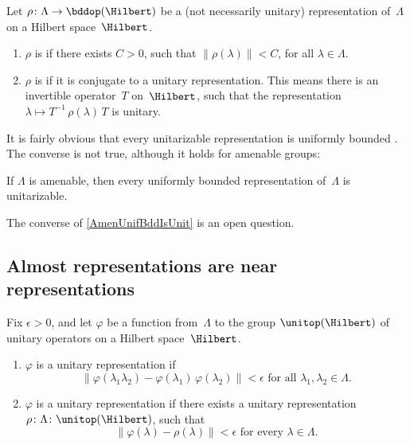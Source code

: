 \begin{defn}
Let $\rho \colon \Lambda \to \bddop(\Hilbert)$ be a (not necessarily unitary) representation of~$\Lambda$ on a Hilbert space~$\Hilbert$.
	\begin{enumerate}
	\item $\rho$ is  if there exists $C > 0$, such that $\| \rho(\lambda) \| < C$, for all $\lambda \in \Lambda$.
	\item $\rho$ is  if it is conjugate to a unitary representation. This means there is an invertible operator~$T$ on~$\Hilbert$, such that the representation $\lambda \mapsto T^{-1} \, \rho(\lambda) \, T$ is unitary.
	\end{enumerate}
\end{defn}

It is fairly obvious that every unitarizable representation is uniformly bounded . The converse is not true, although it holds for amenable groups:

\begin{thm} \label{AmenUnifBddIsUnit}
If $\Lambda$ is amenable, then every uniformly bounded representation of~$\Lambda$ is unitarizable.
\end{thm}

\begin{rem}
The converse of \cref{AmenUnifBddIsUnit} is an open question.
\end{rem}




\subsection{Almost representations are near representations}

\begin{defn}
Fix $\epsilon > 0$, and let $\varphi$ be a function from~$\Lambda$ to the group $\unitop(\Hilbert)$ of unitary operators on a Hilbert space~$\Hilbert$.
	\begin{enumerate}
	\item $\varphi$ is  a unitary representation if 
		$$ \text{$\| \varphi(\lambda_1 \lambda_2) -  \varphi(\lambda_1) \, \varphi( \lambda_2) \| < \epsilon$ for all $\lambda_1,\lambda_2 \in \Lambda$.} $$
	\item $\varphi$ is  a unitary representation if there exists a unitary representation $\rho \colon \Lambda \colon \unitop(\Hilbert)$, such that 
		$$ \text{$\| \varphi(\lambda) - \rho(\lambda) \| < \epsilon$ for every $\lambda \in \Lambda$.} $$
	\end{enumerate}
\end{defn}


